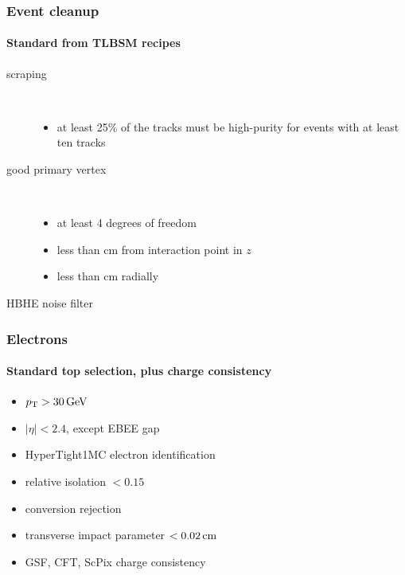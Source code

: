 \documentclass[italian]{beamer}
\begin{document}
\begin{frame}
    \frametitle{Event cleanup}
    \framesubtitle{Standard from TLBSM recipes}
    \begin{description}
        \item[scraping]\hspace*{\fill}\\
            \begin{itemize}
                \item at least 25\% of the tracks must be high-purity for events
            with at least ten tracks
            \end{itemize}
        \item[good primary vertex] \hspace*{\fill}\\
            \begin{itemize}
                \item at least 4 degrees of freedom
                \item less than \unit[25]{cm} from interaction point in $z$
                \item less than \unit[2]{cm} radially
            \end{itemize}
        \item[HBHE noise filter] 
    \end{description}
\end{frame}

\begin{frame}
    \frametitle{Electrons}
    \framesubtitle{Standard top selection, plus charge consistency}
    \begin{itemize}
        \item $\pt > \unit[30]{GeV}$
        \item $|\eta| < 2.4$, except EBEE gap
        \item HyperTight1MC electron identification
        \item relative isolation $< 0.15$
        \item conversion rejection
        \item transverse impact parameter $< \unit[0.02]{cm}$
        \item GSF, CFT, ScPix charge consistency
    \end{itemize}
\end{frame}
\end{document}
